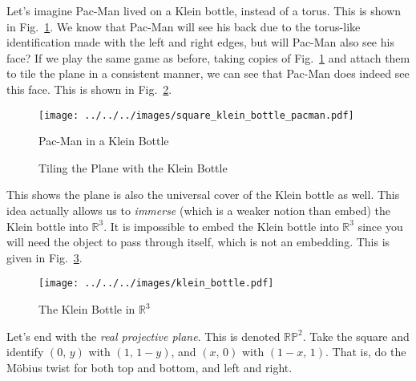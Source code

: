 \documentclass{article}
\theoremstyle{plain}
\theoremstyle{normal}
\begin{document}
        \par\hfill\par
        Let's imagine Pac-Man lived on a Klein bottle, instead of a torus. This
        is shown in Fig.~\ref{fig:square_klein_bottle_pacman}. We know that
        Pac-Man will see his back due to the torus-like identification made with
        the left and right edges, but will Pac-Man also see his face? If we
        play the same game as before, taking copies of
        Fig.~\ref{fig:square_klein_bottle_pacman} and attach them to tile the
        plane in a consistent manner, we can see that Pac-Man does indeed see
        this face. This is shown in Fig.~\ref{fig:plane_klein_bottle_pacman}.
        \begin{figure}
            \centering
            \texttt{[image: ../../../images/square\_klein\_bottle\_pacman.pdf]}
            \caption{Pac-Man in a Klein Bottle}
            \label{fig:square_klein_bottle_pacman}
        \end{figure}
        \begin{figure}
            \centering
            \caption{Tiling the Plane with the Klein Bottle}
            \label{fig:plane_klein_bottle_pacman}
        \end{figure}
        \par\hfill\par
        This shows the plane is also the universal cover of the Klein bottle
        as well. This idea actually allows us to \textit{immerse} (which is a
        weaker notion than embed) the Klein bottle into $\mathbb{R}^{3}$.
        It is impossible to embed the Klein bottle into $\mathbb{R}^{3}$ since
        you will need the object to pass through itself, which is not an
        embedding. This is given in Fig.~\ref{fig:klein_bottle}.
        \begin{figure}
            \centering
            \texttt{[image: ../../../images/klein\_bottle.pdf]}
            \caption{The Klein Bottle in $\mathbb{R}^{3}$}
            \label{fig:klein_bottle}
        \end{figure}
        \par\hfill\par
        Let's end with the \textit{real projective plane}. This is denoted
        $\mathbb{RP}^{2}$. Take the square and identify
        $(0,\,y)$ with $(1,\,1-y)$, and $(x,\,0)$ with $(1-x,\,1)$. That is,
        do the M\"{o}bius twist for both top and bottom, and left and right.
\end{document}
